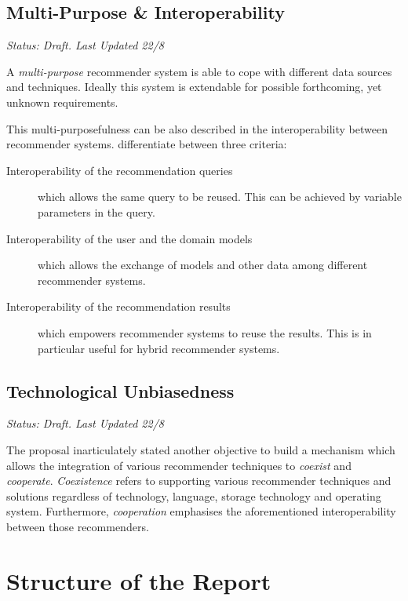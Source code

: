 \subsection{Multi-Purpose \& Interoperability}
\label{intro-objectives-multipurpose}

\emph{Status: Draft. Last Updated 22/8}

A \emph{multi-purpose} recommender system is able to cope with different data sources and techniques. Ideally this system is extendable for possible forthcoming, yet unknown requirements.

This multi-purposefulness can be also described in the interoperability between recommender systems. \citet{manouselis07} differentiate between three criteria:

\begin{description}
    \item[Interoperability of the recommendation queries] which allows the same query to be reused. This can be achieved by variable parameters in the query.
    \item[Interoperability of the user and the domain models] which allows the exchange of models and other data among different recommender systems.
    \item[Interoperability of the recommendation results] which empowers recommender systems to reuse the results. This is in particular useful for hybrid recommender systems.
\end{description}

\subsection{Technological Unbiasedness}

\emph{Status: Draft. Last Updated 22/8}

The proposal inarticulately stated another objective to build a mechanism which allows the integration of various recommender techniques to \emph{coexist} and \emph{cooperate}. \emph{Coexistence} refers to supporting various recommender techniques and solutions regardless of technology, language, storage technology and operating system. Furthermore, \emph{cooperation} emphasises the aforementioned interoperability between those recommenders.

\section{Structure of the Report}

